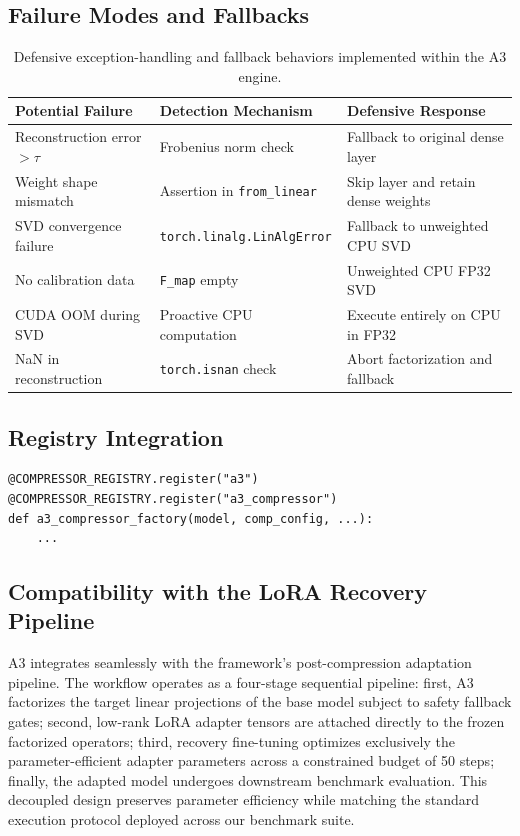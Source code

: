 \subsection{Failure Modes and Fallbacks}

\begin{table}[H]
\centering
\small
\begin{tabular}{lll}
\toprule
\textbf{Potential Failure} & \textbf{Detection Mechanism} & \textbf{Defensive Response} \\
\midrule
Reconstruction error $> \tau$ & Frobenius norm check & Fallback to original dense layer \\
Weight shape mismatch & Assertion in \texttt{from\_linear} & Skip layer and retain dense weights \\
SVD convergence failure & \texttt{torch.linalg.LinAlgError} & Fallback to unweighted CPU SVD \\
No calibration data & \texttt{F\_map} empty & Unweighted CPU FP32 SVD \\
CUDA OOM during SVD & Proactive CPU computation & Execute entirely on CPU in FP32 \\
NaN in reconstruction & \texttt{torch.isnan} check & Abort factorization and fallback \\
\bottomrule
\end{tabular}
\caption{Defensive exception-handling and fallback behaviors implemented within the A3 engine.}
\label{tab:failure_responses}
\end{table}

\subsection{Registry Integration}

\begin{lstlisting}
@COMPRESSOR_REGISTRY.register("a3")
@COMPRESSOR_REGISTRY.register("a3_compressor")
def a3_compressor_factory(model, comp_config, ...):
    ...
\end{lstlisting}

\subsection{Compatibility with the LoRA Recovery Pipeline}

A3 integrates seamlessly with the framework's post-compression adaptation pipeline. The workflow operates as a four-stage sequential pipeline: first, A3 factorizes the target linear projections of the base model subject to safety fallback gates; second, low-rank LoRA adapter tensors are attached directly to the frozen factorized operators; third, recovery fine-tuning optimizes exclusively the parameter-efficient adapter parameters across a constrained budget of 50 steps; finally, the adapted model undergoes downstream benchmark evaluation. This decoupled design preserves parameter efficiency while matching the standard execution protocol deployed across our benchmark suite.